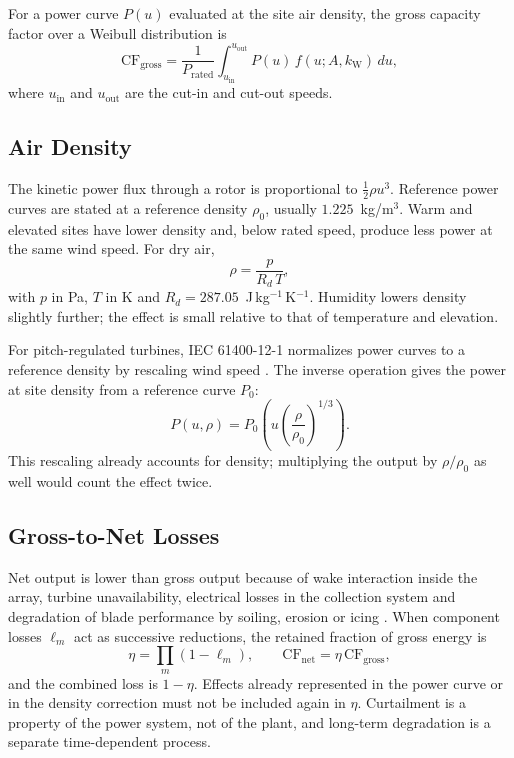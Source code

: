 For a power curve $P(u)$ evaluated at the site air density, the gross
capacity factor over a Weibull distribution is
\begin{equation}
    \mathrm{CF}_{\mathrm{gross}}
    = \frac{1}{P_{\mathrm{rated}}}
      \int_{u_{\mathrm{in}}}^{u_{\mathrm{out}}} P(u)\,f(u;A,k_{\mathrm{W}})\,du ,
    \label{eq:wind_gross_cf}
\end{equation}
where $u_{\mathrm{in}}$ and $u_{\mathrm{out}}$ are the cut-in and
cut-out speeds.

\subsection{Air Density}
\label{subsec:wind_air_density}

The kinetic power flux through a rotor is proportional to
$\tfrac{1}{2}\rho u^3$. Reference power curves are stated at a reference
density $\rho_0$, usually $1.225$~kg/m$^3$. Warm and elevated sites have
lower density and, below rated speed, produce less power at the same
wind speed. For dry air,
\begin{equation}
    \rho = \frac{p}{R_d\,T},
    \label{eq:wind_density_dry}
\end{equation}
with $p$ in Pa, $T$ in K and $R_d=287.05$~J\,kg$^{-1}$\,K$^{-1}$. Humidity
lowers density slightly further; the effect is small relative to that of
temperature and elevation.

For pitch-regulated turbines, IEC 61400-12-1 normalizes power curves to a
reference density by rescaling wind speed \cite{iec61400122022}. The
inverse operation gives the power at site density from a reference curve
$P_0$:
\begin{equation}
    P(u,\rho) = P_0\!\left(u\left(\frac{\rho}{\rho_0}\right)^{1/3}\right).
    \label{eq:wind_density_correction}
\end{equation}
This rescaling already accounts for density; multiplying the output by
$\rho/\rho_0$ as well would count the effect twice.

\subsection{Gross-to-Net Losses}
\label{subsec:wind_losses_theory}

Net output is lower than gross output because of wake interaction inside
the array, turbine unavailability, electrical losses in the collection
system and degradation of blade performance by soiling, erosion or
icing \cite{leefields2021}. When component losses $\ell_m$ act as
successive reductions, the retained fraction of gross energy is
\begin{equation}
    \eta = \prod_{m}(1-\ell_m),
    \qquad
    \mathrm{CF}_{\mathrm{net}} = \eta\,\mathrm{CF}_{\mathrm{gross}},
    \label{eq:wind_net_cf}
\end{equation}
and the combined loss is $1-\eta$. Effects already represented in the
power curve or in the density correction must not be included again in
$\eta$.
Curtailment is a property of the power system, not of the plant, and
long-term degradation is a separate time-dependent process.

